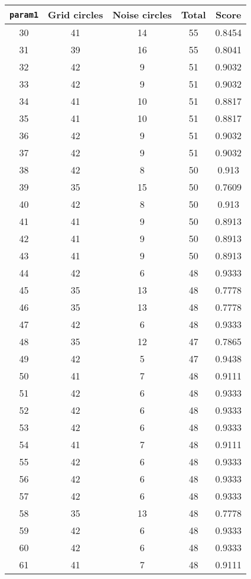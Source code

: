 \documentclass[letterpaper, 12pt]{article}
\begin{document}
\begin{longtable}{|c|c|c|c|c|}
\hline
\textbf{\texttt{param1}} & \textbf{Grid circles} & \textbf{Noise circles} & \textbf{Total} & \textbf{Score} \\
\hline
30 & 41 & 14 & 55 & 0.8454 \\
\hline
31 & 39 & 16 & 55 & 0.8041 \\
\hline
32 & 42 & 9 & 51 & 0.9032 \\
\hline
33 & 42 & 9 & 51 & 0.9032 \\
\hline
34 & 41 & 10 & 51 & 0.8817 \\
\hline
35 & 41 & 10 & 51 & 0.8817 \\
\hline
36 & 42 & 9 & 51 & 0.9032 \\
\hline
37 & 42 & 9 & 51 & 0.9032 \\
\hline
38 & 42 & 8 & 50 & 0.913 \\
\hline
39 & 35 & 15 & 50 & 0.7609 \\
\hline
40 & 42 & 8 & 50 & 0.913 \\
\hline
41 & 41 & 9 & 50 & 0.8913 \\
\hline
42 & 41 & 9 & 50 & 0.8913 \\
\hline
43 & 41 & 9 & 50 & 0.8913 \\
\hline
44 & 42 & 6 & 48 & 0.9333 \\
\hline
45 & 35 & 13 & 48 & 0.7778 \\
\hline
46 & 35 & 13 & 48 & 0.7778 \\
\hline
47 & 42 & 6 & 48 & 0.9333 \\
\hline
48 & 35 & 12 & 47 & 0.7865 \\
\hline
49 & 42 & 5 & 47 & 0.9438 \\
\hline
50 & 41 & 7 & 48 & 0.9111 \\
\hline
51 & 42 & 6 & 48 & 0.9333 \\
\hline
52 & 42 & 6 & 48 & 0.9333 \\
\hline
53 & 42 & 6 & 48 & 0.9333 \\
\hline
54 & 41 & 7 & 48 & 0.9111 \\
\hline
55 & 42 & 6 & 48 & 0.9333 \\
\hline
56 & 42 & 6 & 48 & 0.9333 \\
\hline
57 & 42 & 6 & 48 & 0.9333 \\
\hline
58 & 35 & 13 & 48 & 0.7778 \\
\hline
59 & 42 & 6 & 48 & 0.9333 \\
\hline
60 & 42 & 6 & 48 & 0.9333 \\
\hline
61 & 41 & 7 & 48 & 0.9111 \\

\end{longtable}
\end{document}
